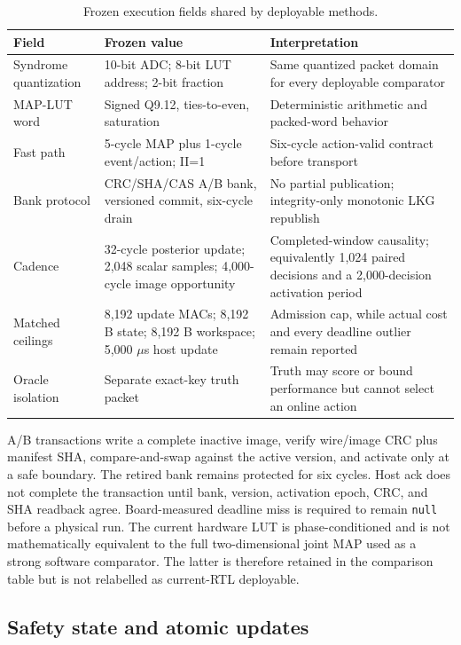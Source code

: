 \documentclass[11pt]{article}
\begin{document}
\begin{table}[htbp]
\centering
\small
\caption{Frozen execution fields shared by deployable methods.}
\label{tab:execution-contract}
\footnotesize
\begin{tabularx}{\textwidth}{@{}L{0.17\textwidth} L{0.27\textwidth} Y@{}}
\toprule
Field & Frozen value & Interpretation \\
\midrule
Syndrome quantization & 10-bit ADC; 8-bit LUT address; 2-bit fraction & Same quantized packet domain for every deployable comparator \\
MAP-LUT word & Signed Q9.12, ties-to-even, saturation & Deterministic arithmetic and packed-word behavior \\
Fast path & 5-cycle MAP plus 1-cycle event/action; II=1 & Six-cycle action-valid contract before transport \\
Bank protocol & CRC/SHA/CAS A/B bank, versioned commit, six-cycle drain & No partial publication; integrity-only monotonic LKG republish \\
Cadence & 32-cycle posterior update; 2,048 scalar samples; 4,000-cycle image opportunity & Completed-window causality; equivalently 1,024 paired decisions and a 2,000-decision activation period \\
Matched ceilings & 8,192 update MACs; 8,192 B state; 8,192 B workspace; 5,000 $\mu$s host update & Admission cap, while actual cost and every deadline outlier remain reported \\
Oracle isolation & Separate exact-key truth packet & Truth may score or bound performance but cannot select an online action \\
\bottomrule
\end{tabularx}
\end{table}

A/B transactions write a complete inactive image, verify wire/image CRC plus
manifest SHA, compare-and-swap against the active version, and activate only at
a safe boundary.  The retired bank remains protected for six cycles.  Host ack
does not complete the transaction until bank, version, activation epoch, CRC,
and SHA readback agree.  Board-measured deadline miss is required to remain
\texttt{null} before a physical run.  The current hardware LUT is
phase-conditioned and is not mathematically equivalent to the full
two-dimensional joint MAP used as a strong software comparator.  The latter is
therefore retained in the comparison table but is not relabelled as current-RTL
deployable.

\subsection{Safety state and atomic updates}
\end{document}
